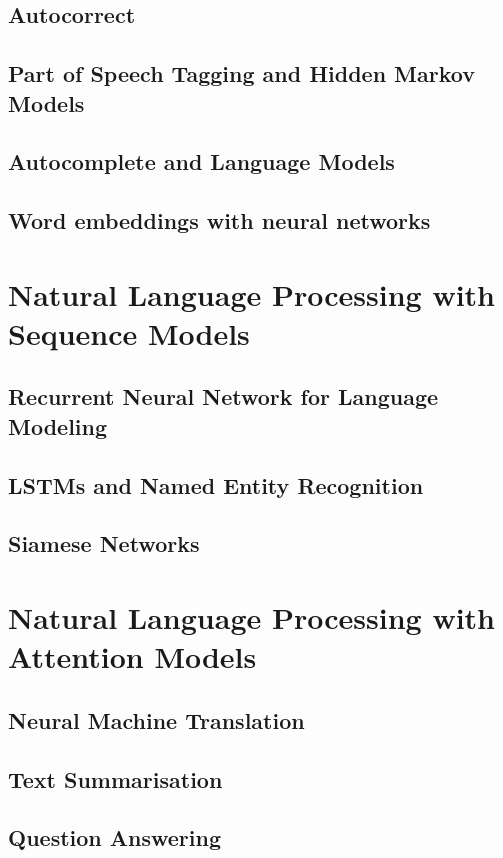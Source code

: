 \documentclass[a4paper, 11pt]{book}
\begin{document}
    \subsection{Autocorrect}
    \subsection{Part of Speech Tagging and Hidden Markov Models}
    \subsection{Autocomplete and Language Models}
    \subsection{Word embeddings with neural networks}
    
    \section{Natural Language Processing with Sequence Models}
    \subsection{Recurrent Neural Network for Language Modeling}
    \subsection{LSTMs and Named Entity Recognition}
    \subsection{Siamese Networks}
    
    \section{Natural Language Processing with Attention Models}
    \subsection{Neural Machine Translation}
    \subsection{Text Summarisation}
    \subsection{Question Answering}
\end{document}
